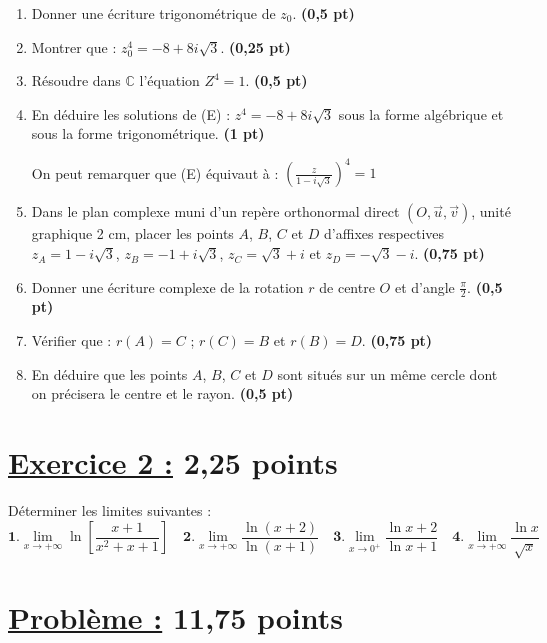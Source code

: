 \documentclass[12pt,a4paper]{article}
\begin{document}
\begin{enumerate}
    \item Donner une écriture trigonométrique de $z_0$. \hfill \textbf{(0,5 pt)}
    \item Montrer que : $z_0^4 = -8 + 8i\sqrt{3}$. \hfill \textbf{(0,25 pt)}
    \item Résoudre dans $\mathbb{C}$ l’équation $Z^4 = 1$. \hfill \textbf{(0,5 pt)}
    \item En déduire les solutions de (E) : $z^4 = -8 + 8i\sqrt{3}$ sous la forme algébrique et sous la forme trigonométrique. \hfill \textbf{(1 pt)}
    
    \medskip
    On peut remarquer que (E) équivaut à :
$\left( \frac{z}{1 - i\sqrt{3}} \right)^4 = 1$
    \item Dans le plan complexe muni d’un repère orthonormal direct $(O, \vec{u}, \vec{v})$, unité graphique 2 cm, placer les points $A$, $B$, $C$ et $D$ d’affixes respectives $z_A = 1 - i\sqrt{3}$, $z_B = -1 + i\sqrt{3}$, $z_C = \sqrt{3} + i$ et $z_D = -\sqrt{3} - i$. \hfill \textbf{(0,75 pt)}
    
    \item Donner une écriture complexe de la rotation $r$ de centre $O$ et d’angle $\frac{\pi}{2}$. \hfill \textbf{(0,5 pt)}
    
    \item Vérifier que : $r(A) = C$ ; $r(C) = B$ et $r(B) = D$. \hfill \textbf{(0,75 pt)}
    
    \item En déduire que les points $A$, $B$, $C$ et $D$ sont situés sur un même cercle dont on précisera le centre et le rayon. \hfill \textbf{(0,5 pt)}
\end{enumerate}

\section*{\underline{Exercice 2 :} 2,25 points }
Déterminer les limites suivantes :
\[
\textbf{1.} \lim\limits_{x \to +\infty} \ln\left[ \frac{x+1}{x^2 + x + 1}\right]  \quad 
\textbf{2.} \lim\limits_{x \to +\infty} \frac{\ln(x+2)}{\ln(x+1)} \quad 
\textbf{3.} \lim\limits_{x \to 0^+} \frac{\ln x+2}{\ln x+1} \quad
\textbf{4.} \lim\limits_{x \to +\infty} \frac{\ln x}{\sqrt{x}}
\]

\section*{\underline{Problème :} 11,75 points }
\end{document}
